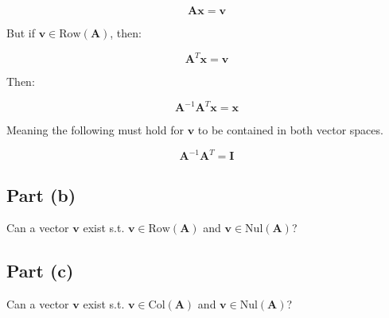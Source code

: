 \documentclass{article}
\begin{document}
\[%
    \mathbf{A}\mathbf{x}=\mathbf{v}
\]%

But if $\mathbf{v} \in \text{Row}(\mathbf{A})$, then:

\[%
    \mathbf{A}^{T}\mathbf{x}
    =
    \mathbf{v}
\]%

Then:

\[%
    \mathbf{A}^{-1}\mathbf{A}^{T}\mathbf{x}=\mathbf{x}
\]%

Meaning the following must hold for $\mathbf{v}$ to be contained in both vector
spaces.

\[%
    \mathbf{A}^{-1}\mathbf{A}^{T} = \mathbf{I}
\]%

\subsection{Part (b)} 
Can a vector $\mathbf{v}$ exist s.t. $\mathbf{v} \in \text{Row}(\mathbf{A})$ and
$\mathbf{v} \in \text{Nul}(\mathbf{A})$?


\subsection{Part (c)} 
Can a vector $\mathbf{v}$ exist s.t. $\mathbf{v} \in \text{Col}(\mathbf{A})$ and
$\mathbf{v} \in \text{Nul}(\mathbf{A})$?
\end{document}

